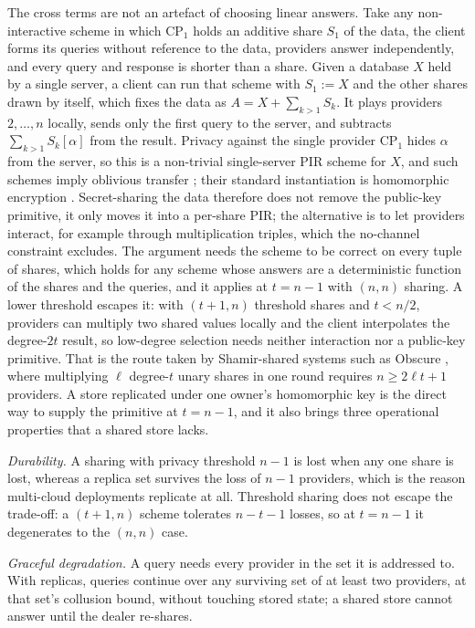 \documentclass[a4paper,fleqn]{cas-sc}
\begin{document}
The cross terms are not an artefact of choosing linear answers. Take any
non-interactive scheme in which $\text{CP}_1$ holds an additive share $S_1$ of
the data, the client forms its queries without reference to the data,
providers answer independently, and every query and response is shorter than a
share. Given a database $X$ held by a single server, a client
can run that scheme with $S_1:=X$ and the other shares drawn by itself, which
fixes the data as $A=X+\sum_{k>1}S_k$. It plays providers $2,\dots,n$ locally,
sends only the first query to the server, and subtracts $\sum_{k>1}S_k[\alpha]$
from the result. Privacy against the single provider $\text{CP}_1$ hides
$\alpha$ from the server, so this is a non-trivial single-server PIR scheme for
$X$, and such schemes imply oblivious transfer \citep{dicrescenzo2000single};
their standard instantiation is homomorphic encryption
\citep{kushilevitz1997replication}. Secret-sharing the data therefore does not
remove the public-key primitive, it only moves it into a per-share PIR; the
alternative is to let providers interact, for example through multiplication
triples, which the no-channel constraint excludes. The argument needs the
scheme to be correct on every tuple of shares, which holds for any scheme whose
answers are a deterministic function of the shares and the queries, and it
applies at $t=n-1$ with $(n,n)$ sharing. A lower threshold escapes it: with
$(t{+}1,n)$ threshold shares and $t<n/2$, providers can multiply two shared
values locally and the client interpolates the degree-$2t$ result, so
low-degree selection needs neither interaction nor a public-key primitive. That
is the route taken by Shamir-shared systems such as Obscure
\citep{gupta2020obscure}, where multiplying $\ell$ degree-$t$ unary shares in
one round requires $n \ge 2\ell t + 1$ providers. A store replicated
under one owner's homomorphic key is the direct way to supply the primitive at
$t=n-1$, and it also brings three operational properties that a shared store
lacks.

\emph{Durability.} A sharing with privacy threshold $n-1$ is lost when any one
share is lost, whereas a replica set survives the loss of $n-1$ providers,
which is the reason multi-cloud deployments replicate at all. Threshold
sharing does not escape the trade-off: a $(t{+}1,n)$ scheme tolerates
$n-t-1$ losses, so at $t=n-1$ it degenerates to the $(n,n)$ case.

\emph{Graceful degradation.} A query needs every provider in the set it is
addressed to. With replicas, queries continue over any surviving set of at
least two providers, at that set's collusion bound, without touching stored
state; a shared store cannot answer until the dealer re-shares.
\end{document}
